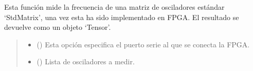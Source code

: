 \documentclass[letterpaper,10pt,english]{sphinxmanual}
\begin{document}
\begin{fulllineitems}

\begin{fulllineitems}
\label{\detokenize{fpga.ring_osc:fpga.ring_osc.StdMatrix.medir}}
\pysigstartsignatures
{}
\pysigstopsignatures
\sphinxAtStartPar
Esta función mide la frecuencia de una matriz de osciladores estándar ‘StdMatrix’, una vez esta ha sido implementado en FPGA. El resultado se devuelve como un objeto ‘Tensor’.
\begin{quote}\begin{description}
\begin{itemize}
\item {} 
\sphinxAtStartPar
{} (\sphinxstyleliteralemphasis{\sphinxupquote{, }}) \textendash{} Esta opción especifica el puerto serie al que se conecta la FPGA.

\item {} 
\sphinxAtStartPar
{} (\sphinxstyleliteralemphasis{\sphinxupquote{ | }}\sphinxstyleliteralemphasis{\sphinxupquote{(}}\sphinxstyleliteralemphasis{\sphinxupquote{)}}\sphinxstyleliteralemphasis{\sphinxupquote{, }}) \textendash{} Lista de osciladores a medir.


\end{itemize}
\end{description}
\end{quote}
\end{fulllineitems}
\end{fulllineitems}
\end{document}
